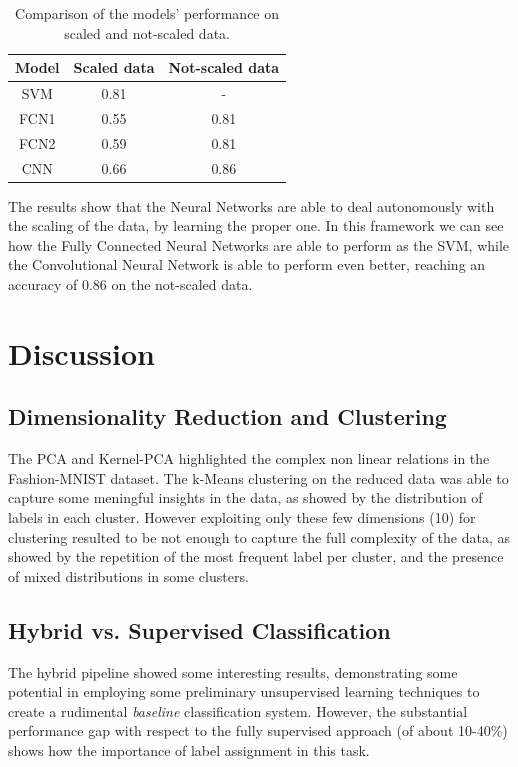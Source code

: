 \documentclass[a4paper, 10pt]{article}
\begin{document}
\begin{table}[ht]
    \centering
    \begin{tabular}{|c|c|c|}
        \hline
        \textbf{Model} & \textbf{Scaled data} & \textbf{Not-scaled data} \\
        \hline
        \hline
        SVM  & 0.81 &  -   \\
        FCN1 & 0.55 & 0.81 \\
        FCN2 & 0.59 & 0.81 \\
        CNN  & 0.66 & 0.86 \\
        \hline
    \end{tabular}
    \caption{Comparison of the models' performance on scaled and not-scaled data.}
    \label{tab:scaling}
\end{table}

The results show that the Neural Networks are able to deal autonomously with the scaling of the data, by learning the proper one.
In this framework we can see how the Fully Connected Neural Networks are able to perform as the SVM, while the Convolutional Neural Network is able to perform
even better, reaching an accuracy of $0.86$ on the not-scaled data.

\section{Discussion}

\subsection{Dimensionality Reduction and Clustering}
The PCA and Kernel-PCA highlighted the complex non linear relations in the Fashion-MNIST dataset. The k-Means clustering on the reduced data was able to capture
some meningful insights in the data, as showed by the distribution of labels in each cluster. However exploiting only these few dimensions (10) for clustering
resulted to be not enough to capture the full complexity of the data, as showed by the repetition of the most frequent label per cluster, and the presence of 
mixed distributions in some clusters.

\subsection{Hybrid vs. Supervised Classification}
The hybrid pipeline showed some interesting results, demonstrating some potential in employing some preliminary unsupervised learning techniques to create a
rudimental \textit{baseline} classification system. However, the substantial performance gap with respect to the fully supervised approach (of about 10-40\%) shows how the
importance of label assignment in this task. 
\end{document}

